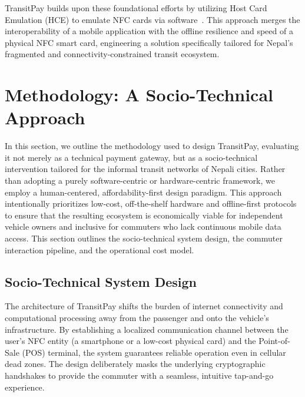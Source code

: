 \documentclass[manuscript,review,anonymous]{acmart}
\begin{document}
TransitPay builds upon these foundational efforts by utilizing Host Card Emulation (HCE) to emulate NFC cards via software~\cite{alattar2014host, alliance2014host}. This approach merges the interoperability of a mobile application with the offline resilience and speed of a physical NFC smart card, engineering a solution specifically tailored for Nepal's fragmented and connectivity-constrained transit ecosystem.

\section{Methodology: A Socio-Technical Approach}

In this section, we outline the methodology used to design TransitPay, evaluating it not merely as a technical payment gateway, but as a socio-technical intervention tailored for the informal transit networks of Nepali cities. Rather than adopting a purely software-centric or hardware-centric framework, we employ a human-centered, affordability-first design paradigm. This approach intentionally prioritizes low-cost, off-the-shelf hardware and offline-first protocols to ensure that the resulting ecosystem is economically viable for independent vehicle owners and inclusive for commuters who lack continuous mobile data access. This section outlines the socio-technical system design, the commuter interaction pipeline, and the operational cost model.

\subsection{Socio-Technical System Design}


The architecture of TransitPay shifts the burden of internet connectivity and computational processing away from the passenger and onto the vehicle's infrastructure. By establishing a localized communication channel between the user's NFC entity (a smartphone or a low-cost physical card) and the Point-of-Sale (POS) terminal, the system guarantees reliable operation even in cellular dead zones. The design deliberately masks the underlying cryptographic handshakes to provide the commuter with a seamless, intuitive tap-and-go experience.
\end{document}
